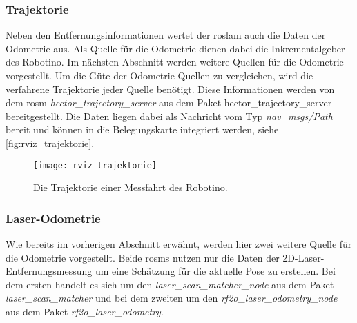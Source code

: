 \begin{comment}
--------------------------------------------------------------------------------
- \url{http://wiki.ros.org/hector_trajectory_server}
- \url{http://docs.ros.org/api/nav_msgs/html/msg/Path.html}
\end{comment}
\subsubsection{Trajektorie}

Neben den Entfernungsinformationen wertet der \Gls{roslam} auch die Daten der Odometrie aus. Als Quelle für die Odometrie dienen dabei die Inkrementalgeber des Robotino. Im nächsten Abschnitt werden weitere Quellen für die Odometrie vorgestellt. Um die Güte der Odometrie-Quellen zu vergleichen, wird die verfahrene Trajektorie jeder Quelle benötigt. Diese Informationen werden von dem \Gls{rosm} \textit{hector\_trajectory\_server} aus dem Paket {hector\_trajectory\_server} bereitgestellt. Die Daten liegen dabei als Nachricht vom Typ \textit{nav\_msgs/Path} bereit und können in die Belegungskarte integriert werden, siehe \autoref{fig:rviz_trajektorie}.

\begin{figure}[h]
	\centering
	\texttt{[image: rviz\_trajektorie]}
	\caption{Die Trajektorie einer Messfahrt des Robotino.}
	\label{fig:rviz_trajektorie}
\end{figure}


\begin{comment}
--------------------------------------------------------------------------------
- \url{http://wiki.ros.org/rf2o}
- \url{http://wiki.ros.org/laser_scan_matcher}
\end{comment}
\subsubsection{Laser-Odometrie}

Wie bereits im vorherigen Abschnitt erwähnt, werden hier zwei weitere Quelle für die Odometrie vorgestellt. Beide \Glspl{rosm} nutzen nur die Daten der 2D-Laser-Entfernungsmessung um eine Schätzung für die aktuelle Pose zu erstellen. Bei dem ersten handelt es sich um den \textit{laser\_scan\_matcher\_node} aus dem Paket \textit{laser\_scan\_matcher} und bei dem zweiten um den \textit{rf2o\_laser\_odometry\_node} aus dem Paket \textit{rf2o\_laser\_odometry}.


